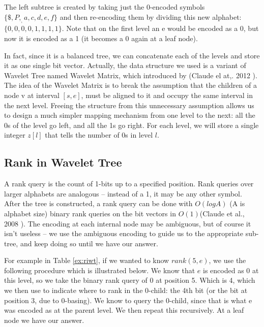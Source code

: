 The left subtree is created by taking just the 0-encoded symbols \(\{\$,P,_,a,c,d,e,f\}\) and then re-encoding them by dividing this new alphabet: \(\{0,0,0,0,1,1,1,1\}\). Note that on the first level an e would be encoded as a 0, but now it is encoded as a 1 (it becomes a 0 again at a leaf node).

In fact, since it is a balanced tree, we can concatenate each of the levels and store it as one single bit vector.
Actually, the data structure we used is a variant of Wavelet Tree named Wavelet Matrix, which introduced by (Claude el at,. 2012 \cite{claude2012}).
The idea of the Wavelet Matrix is to break the assumption that the children of a node v at interval \([s,e]\), must be aligned to it and occupy the same interval in the next level. Freeing the structure from this unnecessary assumption allows us to design a much simpler mapping mechanism from one level to the next: all the 0s of the level go left, and all the 1s go right. For each level, we will store a single integer \(z[l]\) that tells the number of 0s in level \(l\).

\subsection{Rank in Wavelet Tree}

A rank query is the count of 1-bits up to a specified position. Rank queries over larger alphabets are analogous – instead of a 1, it may be any other symbol.
After the tree is constructed, a rank query can be done with \(O(logA)\) (A is alphabet size) binary rank queries on the bit vectors in \(O(1)\)(Claude et al., 2008 \cite{claude2008}). The encoding at each internal node may be ambiguous, but of course it isn’t useless – we use the ambiguous encoding to guide us to the appropriate sub-tree, and keep doing so until we have our answer.

For example in Table \ref{ex:riwt}, if we wanted to know \(rank(5,e)\), we use the following procedure which is illustrated below. We know that \(e\) is encoded as 0 at this level, so we take the binary rank query of 0 at position 5. Which is 4, which we then use to indicate where to rank in the 0-child: the 4th bit (or the bit at position 3, due to 0-basing). We know to query the 0-child, since that is what e was encoded as at the parent level. We then repeat this recursively. At a leaf node we have our answer.

